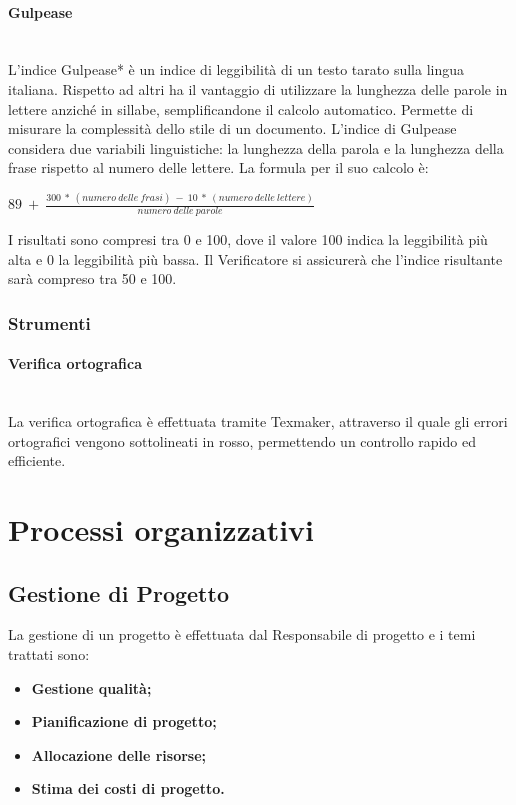 \documentclass[11pt,a4paper]{article}
\begin{document}
\paragraph{Gulpease}
\noindent \\ 
L'indice Gulpease* è un indice di leggibilità di un testo tarato sulla lingua italiana. Rispetto ad altri ha il vantaggio di utilizzare la lunghezza delle parole in lettere anziché in sillabe, semplificandone il calcolo automatico. Permette di misurare la complessità dello stile di un documento. L'indice di Gulpease considera due variabili linguistiche: la lunghezza della parola e la lunghezza della frase rispetto al numero delle lettere. La formula per il suo calcolo è:
\begin{center}
	$89\ +\ \frac{300\ *\ (numero\ delle\ frasi)\ -\ 10\ *\ (numero\ delle\ lettere)}{numero\ delle\ parole}$
\end{center}
I risultati sono compresi tra 0 e 100, dove il valore 100 indica la leggibilità più alta e 0 la leggibilità più bassa. Il Verificatore si assicurerà che l'indice risultante sarà compreso tra 50 e 100.


\subsubsection{Strumenti}
\paragraph{Verifica ortografica}
\noindent \\
La verifica ortografica è effettuata tramite Texmaker, attraverso il quale gli errori ortografici vengono sottolineati in rosso, permettendo un controllo rapido ed efficiente.


\newpage
\section{Processi organizzativi}

\subsection{Gestione di Progetto}
La gestione di un progetto è effettuata dal Responsabile di progetto e i temi trattati sono:
\begin{itemize}
\item \textbf{Gestione qualità;}
\item \textbf{Pianificazione di progetto;}
\item \textbf{Allocazione delle risorse;}
\item \textbf{Stima dei costi di progetto.}
\end{itemize}
\end{document}
